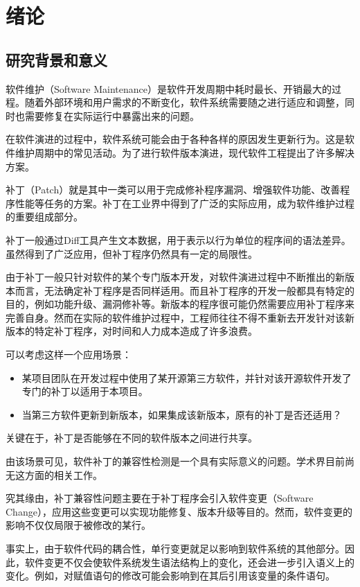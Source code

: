 \chapter{绪论}
\section{研究背景和意义}

软件维护（Software Maintenance）是软件开发周期中耗时最长、开销最大的过程\cite{lehnert2011review}。随着外部环境和用户需求的不断变化，软件系统需要随之进行适应和调整，同时也需要修复在实际运行中暴露出来的问题。

在软件演进的过程中，软件系统可能会由于各种各样的原因发生更新行为。这是软件维护周期中的常见活动\cite{pigoski1996practical}。为了进行软件版本演进，现代软件工程提出了许多解决方案。

补丁（Patch）就是其中一类可以用于完成修补程序漏洞、增强软件功能、改善程序性能等任务的方案。补丁在工业界中得到了广泛的实际应用，成为软件维护过程的重要组成部分\cite{le2014patch}。

补丁一般通过Diff工具产生文本数据\cite{hunt1976algorithm}，用于表示以行为单位的程序间的语法差异。虽然得到了广泛应用，但补丁程序仍然具有一定的局限性。

由于补丁一般只针对软件的某个专门版本开发，对软件演进过程中不断推出的新版本而言，无法确定补丁程序是否同样适用。而且补丁程序的开发一般都具有特定的目的，例如功能升级、漏洞修补等。新版本的程序很可能仍然需要应用补丁程序来完善自身。然而在实际的软件维护过程中，工程师往往不得不重新去开发针对该新版本的特定补丁程序，对时间和人力成本造成了许多浪费。

可以考虑这样一个应用场景：

\begin{itemize}
	\item 某项目团队在开发过程中使用了某开源第三方软件，并针对该开源软件开发了专门的补丁以适用于本项目。
	\item 当第三方软件更新到新版本，如果集成该新版本，原有的补丁是否还适用？
\end{itemize}

关键在于，补丁是否能够在不同的软件版本之间进行共享。

由该场景可见，软件补丁的兼容性检测是一个具有实际意义的问题。学术界目前尚无这方面的相关工作。

究其缘由，补丁兼容性问题主要在于补丁程序会引入软件变更（Software Change）\cite{buckley2005towards}，应用这些变更可以实现功能修复、版本升级等目的。然而，软件变更的影响不仅仅局限于被修改的某行。

事实上，由于软件代码的耦合性，单行变更就足以影响到软件系统的其他部分\cite{wilkerson2012software,tao2012software}。因此，软件变更不仅会使软件系统发生语法结构上的变化，还会进一步引入语义上的变化。例如，对赋值语句的修改可能会影响到在其后引用该变量的条件语句。

